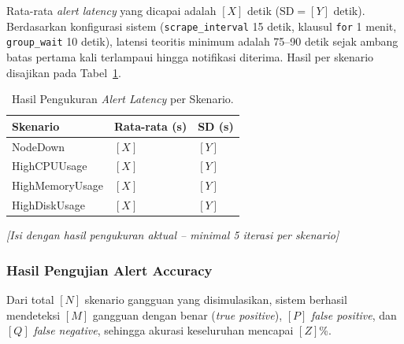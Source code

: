 \documentclass[10pt,twocolumn]{article}
\begin{document}
Rata-rata \textit{alert latency} yang dicapai adalah $[\mathit{X}]$ detik
($\text{SD} = [\mathit{Y}]$ detik). Berdasarkan konfigurasi sistem (\texttt{scrape\_interval} 15
detik, klausul \texttt{for} 1 menit, \texttt{group\_wait} 10 detik), latensi teoritis minimum adalah
75--90 detik sejak ambang batas pertama kali terlampaui hingga notifikasi diterima. Hasil per skenario
disajikan pada Tabel~\ref{tab:alert-latency}.

\begin{table}[H]
  \centering
  \caption{Hasil Pengukuran \textit{Alert Latency} per Skenario.}
  \label{tab:alert-latency}
  \begin{tabularx}{\linewidth}{lXX}
    \toprule
    \textbf{Skenario} & \textbf{Rata-rata (s)} & \textbf{SD (s)} \\
    \midrule
    NodeDown            & $[\mathit{X}]$ & $[\mathit{Y}]$ \\
    HighCPUUsage        & $[\mathit{X}]$ & $[\mathit{Y}]$ \\
    HighMemoryUsage     & $[\mathit{X}]$ & $[\mathit{Y}]$ \\
    HighDiskUsage       & $[\mathit{X}]$ & $[\mathit{Y}]$ \\
    \bottomrule
  \end{tabularx}
  \small\textit{[Isi dengan hasil pengukuran aktual -- minimal 5 iterasi per skenario]}
\end{table}

\subsubsection{Hasil Pengujian Alert Accuracy}

Dari total $[\mathit{N}]$ skenario gangguan yang disimulasikan, sistem berhasil mendeteksi
$[\mathit{M}]$ gangguan dengan benar (\textit{true positive}), $[\mathit{P}]$ \textit{false
positive}, dan $[\mathit{Q}]$ \textit{false negative}, sehingga akurasi keseluruhan mencapai
$[\mathit{Z}]$\%.
\end{document}
